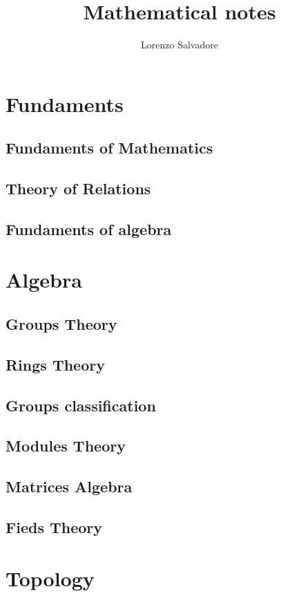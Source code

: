 \documentclass{book}
\title{Mathematical notes}
\author{Lorenzo Salvadore}
\date{}
\begin{document}
	\maketitle
	\tableofcontents
	\part{Fundaments}
	\chapter{Fundaments of Mathematics}
	
	\chapter{Theory of Relations}
	
	\chapter{Fundaments of algebra}
	
	\part{Algebra}
	\chapter{Groups Theory}
	
	\chapter{Rings Theory}
	
	\chapter{Groups classification}
	
	\chapter{Modules Theory}
	
	\chapter{Matrices Algebra}
	
	\chapter{Fieds Theory}
	
	\part{Topology}
\end{document}
